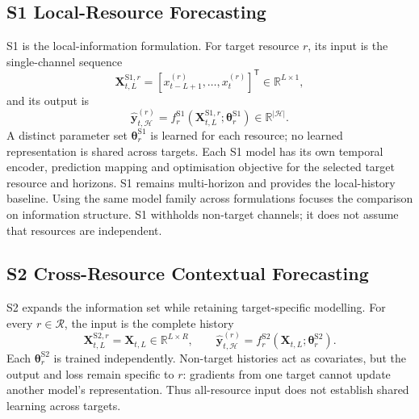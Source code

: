 \documentclass[a4paper,fleqn]{cas-dc}
\begin{document}
\subsection{S1 Local-Resource Forecasting}
\label{sec:s1}

S1 is the local-information formulation. For target resource $r$, its input is
the single-channel sequence
\begin{equation}
  \mathbf{X}_{t,L}^{\mathrm{S1},r}
  = [x_{t-L+1}^{(r)},\ldots,x_t^{(r)}]^{\mathsf T}
  \in\mathbb{R}^{L\times 1},
  \label{eq:s1-input}
\end{equation}
and its output is
\begin{equation}
  \widehat{\mathbf{y}}_{t,\mathcal{H}}^{(r)}
  = f_r^{\mathrm{S1}}
    (\mathbf{X}_{t,L}^{\mathrm{S1},r};\boldsymbol{\theta}_r^{\mathrm{S1}})
  \in\mathbb{R}^{|\mathcal{H}|}.
  \label{eq:s1-forecast}
\end{equation}
A distinct parameter set $\boldsymbol{\theta}_r^{\mathrm{S1}}$ is learned for
each resource; no learned representation is shared across targets. Each S1
model has its own temporal encoder, prediction mapping and optimisation
objective for the selected target resource and horizons. S1 remains
multi-horizon and provides the local-history baseline. Using the same model
family across formulations focuses the comparison on information structure.
S1 withholds non-target channels; it does not assume that resources are
independent.

\subsection{S2 Cross-Resource Contextual Forecasting}
\label{sec:s2}

S2 expands the information set while retaining target-specific modelling. For
every $r\in\mathcal{R}$, the input is the complete history
\begin{equation}
  \mathbf{X}_{t,L}^{\mathrm{S2},r}=\mathbf{X}_{t,L}
  \in\mathbb{R}^{L\times R},
  \qquad
  \widehat{\mathbf{y}}_{t,\mathcal{H}}^{(r)}
  = f_r^{\mathrm{S2}}
    (\mathbf{X}_{t,L};\boldsymbol{\theta}_r^{\mathrm{S2}}).
  \label{eq:s2-forecast}
\end{equation}
Each $\boldsymbol{\theta}_r^{\mathrm{S2}}$ is trained independently.
Non-target histories act as covariates, but the output and loss remain
specific to $r$: gradients from one target cannot update another model's
representation. Thus all-resource input does not establish shared learning
across targets.
\end{document}
